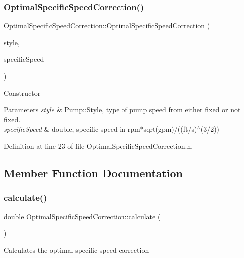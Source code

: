 \subsubsection{\texorpdfstring{Optimal\+Specific\+Speed\+Correction()}{OptimalSpecificSpeedCorrection()}}
{\footnotesize\ttfamily Optimal\+Specific\+Speed\+Correction\+::\+Optimal\+Specific\+Speed\+Correction (\begin{DoxyParamCaption}\item[{\hyperlink{class_pump_aef354601ce4218258cc898b35a1e90ff}{Pump\+::\+Style}}]{style,  }\item[{double}]{specific\+Speed }\end{DoxyParamCaption})\hspace{0.3cm}{\ttfamily [inline]}}

Constructor 
\begin{DoxyParams}{Parameters}
{\em style} & \hyperlink{class_pump_aef354601ce4218258cc898b35a1e90ff}{Pump\+::\+Style}, type of pump speed from either fixed or not fixed. \\
\hline
{\em specific\+Speed} & double, specific speed in rpm$\ast$sqrt(gpm)/((ft/s)$^\wedge$(3/2)) \\
\hline
\end{DoxyParams}


Definition at line 23 of file Optimal\+Specific\+Speed\+Correction.\+h.



\subsection{Member Function Documentation}
\mbox{\label{class_optimal_specific_speed_correction_a3337ebde4e64c20f19adbda6204fa0be}} 
\subsubsection{\texorpdfstring{calculate()}{calculate()}}
{\footnotesize\ttfamily double Optimal\+Specific\+Speed\+Correction\+::calculate (\begin{DoxyParamCaption}{ }\end{DoxyParamCaption})}

Calculates the optimal specific speed correction

